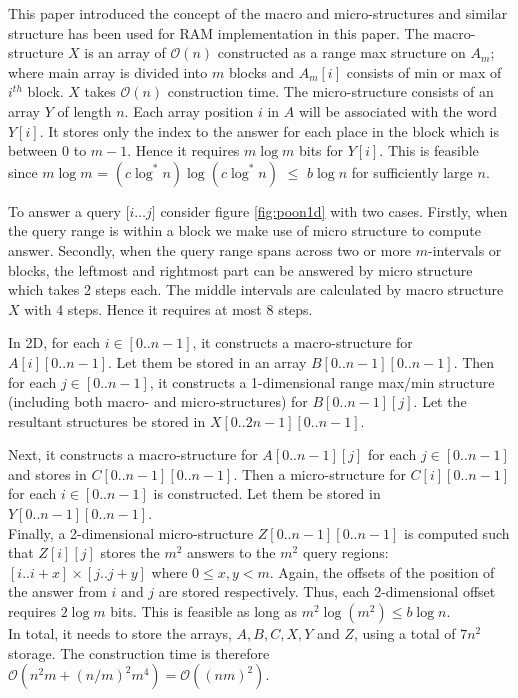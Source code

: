 This paper introduced the concept of the macro and micro-structures and similar structure has been used for RAM implementation in this paper. The macro-structure $X$ is an array of $\mathcal{O}(n)$ constructed as a range max structure on $A_m$; where main array is divided into $m$ blocks and $A_m[i]$ consists of min or max of $i^{th}$ block. $X$ takes $\mathcal{O}(n)$ construction time. The micro-structure consists of an array $Y$ of length $n$. Each array position $i$ in $A$ will be associated with the word $Y[i]$. It stores only the index to the answer for each place in the block which is between $0$ to $m-1$. Hence it requires $m \log m$ bits for $Y[i]$. This is feasible since $m \log m$ = $(c \log^* n)\log(c \log^* n)$ $\leq$ $b \log n$ for sufficiently large $n$.

To answer a query [$ i \ldots j]$ consider figure \ref{fig:poon1d} with two cases. Firstly, when the query range is within a block we make use of micro structure to compute answer. Secondly, when the query range spans across two or more $m$-intervals or blocks, the leftmost and rightmost part can be answered by micro structure which takes 2 steps each. The middle intervals are calculated by macro structure $X$ with 4 steps. Hence it requires at most 8 steps.

In 2D, for each $i \in [0..n - 1]$, it constructs a macro-structure for $A[i][0..n - 1]$. Let them be stored in an array $B[0..n - 1][0..n - 1]$. Then for each $j \in [0..n - 1]$, it constructs a 1-dimensional range max/min structure (including both macro- and micro-structures) for $B[0..n - 1][j]$. Let the resultant structures be stored in $X[0..2n - 1][0..n - 1]$.

Next, it constructs a macro-structure for $A[0..n - 1][j]$ for each $j \in [0..n - 1]$ and stores in $C[0..n-1][0..n-1]$. Then a micro-structure for $C[i][0..n-1]$ for each $i \in [0..n-1]$ is constructed. Let them be stored in $Y [0..n-1][0..n-1]$.\\
Finally, a 2-dimensional micro-structure $Z[0..n-1][0..n-1]$ is computed such that $Z[i][j]$ stores the $m^2$ answers to the $m^2$ query regions: $[i..i + x] \times [j..j + y]$ where $0 \leq x,y < m$. Again, the offsets of the position of the answer from $i$ and $j$ are stored respectively. Thus, each 2-dimensional offset requires $2 \log m$ bits. This is feasible as long as $m^2 \log(m^2) \leq b \log n$.\\
In total, it needs to store the arrays, $A,B,C,X,Y$ and $Z$, using a total of $7n^2$ storage. The construction time is therefore $\mathcal{O}(n^2m + (n/m)^2m^4) = \mathcal{O}((nm)^2)$.

